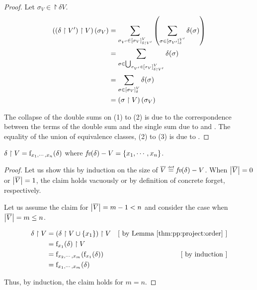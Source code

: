 \begin{proof} Let $ \sigma_V \in \project{\delta}{V} $.
\begin{align}
\left( \left( \delta \upharpoonright V' \right) \upharpoonright V \right)(\sigma_V)
& = \sum_{\sigma_{V'} \in \left[ \sigma_V \right]_{ \delta \upharpoonright V'
}^{V}} \left(  \sum_{\sigma \in \left[ \sigma_{V'} \right]_{\delta}^{V'}
} \delta (\sigma)  \right) \\ &
= \sum_{\sigma \in \bigcup_{\sigma_{V'} \in \left[ \sigma_V \right]_{ \delta \upharpoonright V'
}^{V} }} \delta(\sigma) \\ &
= \sum_{\sigma \in \left[ \sigma_V \right]_{\delta}^{V} } \delta (\sigma) \\
& = \left( \sigma \upharpoonright V \right)(\sigma_V)
\end{align}

The collapse of the double sums on (1) to (2) is due to the
correspondence between the terms of the double sum and the single sum
due to  and . The equality of the
union of equivalence classes, (2) to (3) is due
to .
\end{proof}

\begin{corollary}\label{thm:pp:project:forgetseq} $ \delta \upharpoonright V = \mathrm{f}_{x_1, \cdots,
x_n}(\delta)$ where $ \textit{fv}(\delta) - V = \left\{ x_1, \cdots, x_n \right\} $.
\end{corollary}

\begin{proof} Let us show this by induction on the size of
$ \overline{V} \stackrel{\smash{\scriptscriptstyle \mathrm{def}}}= \textit{fv}(\delta) - V $. When $ \left| \overline{V} \right| = 0 $ or
$ \left| \overline{V} \right| = 1 $, the claim holds vacuously or by
definition of concrete forget, respectively.

Let us assume the claim for $ \left| \overline{V} \right| = m - 1 < n $ and consider
the case when $ \left| \overline{V} \right| = m \leq n $.

\begin{align*}
\project{\delta}{V}
& = \project{\paren{\project{\delta}{V
\cup \set{x_1}}}}{V} & \mathstep{by \lref{thm:pp:project:order}}\\
& = \project{\forget{x_1}{\delta}}{V} \\
& = \forget{x_2, \cdots,
x_m}{\forget{x_1}{\delta}} & \mathstep{by induction} \\
& = \forget{x_1, \cdots, x_m}{\delta}
\end{align*}

Thus, by induction, the claim holds for $ m = n $.
\end{proof}


